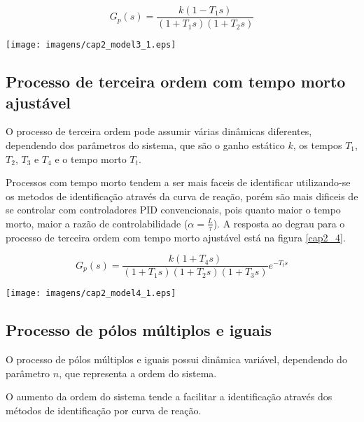     \begin{equation}
        G_p(s) = \frac{k(1-T_1 s)}{(1+T_1 s)(1+T_2 s)}
    \end{equation}

    \begin{center}
        \texttt{[image: imagens/cap2\_model3\_1.eps]}
        \label{cap2_3}
    \end{center}

\subsection{Processo de terceira ordem com tempo morto ajustável}
    
    O processo de terceira ordem pode assumir várias dinâmicas diferentes, dependendo
    dos parâmetros do sistema, que são o ganho estático $k$, os tempos $T_1$, $T_2$,
    $T_3$ e $T_4$ e o tempo morto $T_t$.
    
    Processos com tempo morto tendem a ser mais faceis de identificar utilizando-se
    os metodos de identificação através da curva de reação, porém são mais dificeis
    de se controlar com controladores \acs{PID} convencionais, pois quanto maior
    o tempo morto, maior a razão de controlabilidade ($\alpha = \frac{L}{\tau}$).
    A resposta ao degrau para o processo de terceira ordem com tempo morto ajustável
    está na figura \ref{cap2_4}.
    
    \begin{equation}
        G_p(s) = \frac{k(1+T_4 s)}{(1+T_1 s)(1+T_2 s)(1+T_3 s)} e^{-T_t s}
    \end{equation}
    
    \begin{center}
        \texttt{[image: imagens/cap2\_model4\_1.eps]}
        \label{cap2_4}
    \end{center}

\subsection{Processo de pólos múltiplos e iguais}

    O processo de pólos múltiplos e iguais possui dinâmica variável, dependendo
    do parâmetro $n$, que representa a ordem do sistema.
    
    O aumento da ordem do sistema tende a facilitar a identificação através dos
    métodos de identificação por curva de reação.
    
